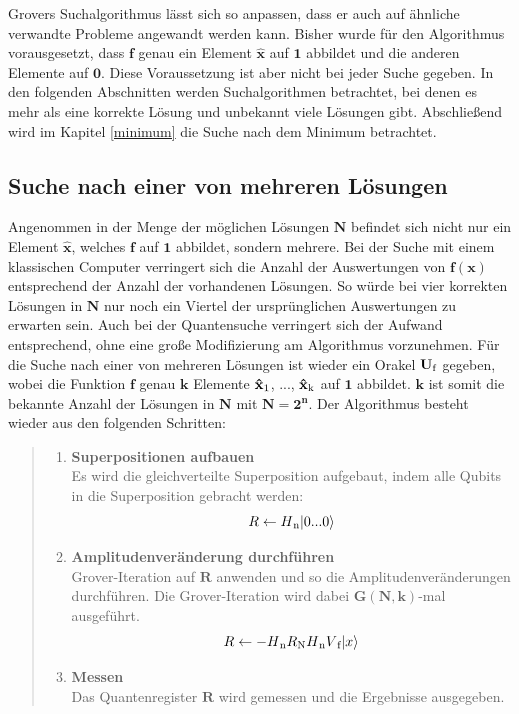 Grovers Suchalgorithmus lässt sich so anpassen, dass er auch auf ähnliche verwandte Probleme angewandt werden kann.
Bisher wurde für den Algorithmus vorausgesetzt, dass $\mathbf{f}$ genau ein Element $\mathbf{\hat x}$ auf $\mathbf{1}$ abbildet und die anderen Elemente auf $\mathbf{0}$. 
Diese Voraussetzung ist aber nicht bei jeder Suche gegeben. In den folgenden Abschnitten werden Suchalgorithmen betrachtet, bei denen es mehr als eine korrekte Lösung und unbekannt viele Lösungen gibt. 
Abschließend wird im Kapitel \ref{minimum} die Suche nach dem Minimum betrachtet. 

\subsection{Suche nach einer von mehreren Lösungen}

Angenommen in der Menge der möglichen Lösungen $\mathbf{N}$ befindet sich nicht nur ein Element $\mathbf{\hat x}$, welches $\mathbf{f}$ auf $\mathbf{1}$ abbildet, sondern mehrere. 
Bei der Suche mit einem klassischen Computer verringert sich die Anzahl der Auswertungen von $\mathbf{f(x)}$ entsprechend der Anzahl der vorhandenen Lösungen. So würde bei vier korrekten Lösungen in $\mathbf{N}$ nur noch ein Viertel der ursprünglichen Auswertungen zu erwarten sein.
Auch bei der Quantensuche verringert sich der Aufwand entsprechend, ohne eine große Modifizierung am Algorithmus vorzunehmen.
Für die Suche nach einer von mehreren Lösungen ist wieder ein Orakel $\mathbf{U \textsubscript{f}}$ gegeben, wobei die Funktion $\mathbf{f}$ genau $\mathbf{k}$ Elemente $\mathbf{\hat x \textsubscript{1}}$, ..., $\mathbf{\hat x \textsubscript{k}}$ auf $\mathbf{1}$ abbildet. $\mathbf{k}$ ist somit die bekannte Anzahl der Lösungen in $\mathbf{N}$ mit $\mathbf{N = 2^n}$. 
Der Algorithmus besteht wieder aus den folgenden Schritten:
\begin{quote}
	\begin{enumerate}
		\item \textbf{Superpositionen aufbauen}
		\\
		Es wird die gleichverteilte Superposition aufgebaut, indem alle Qubits in die Superposition gebracht werden:
		\\
		\begin{equation}
			R \leftarrow H\textsubscript{n} |0 ... 0\rangle 
		\end{equation}
		\item \textbf{Amplitudenveränderung durchführen}
		\\
		Grover-Iteration auf $\mathbf{R}$ anwenden und so die Amplitudenveränderungen durchführen. Die Grover-Iteration wird dabei $\mathbf{G(N,k)}$-mal ausgeführt.
		\\
		\begin{equation}
			R \leftarrow -H\textsubscript{n} R\textsubscript{N} H\textsubscript{n} V\textsubscript{f} |x\rangle
		\end{equation}
		\item \textbf{Messen}
		\\
		Das Quantenregister $\mathbf{R}$ wird gemessen und die Ergebnisse ausgegeben.
	\end{enumerate}
\end{quote}

